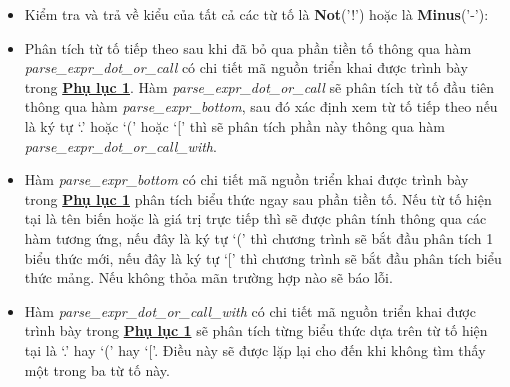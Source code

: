 \begin{itemize}
    \item Kiểm tra và trả về kiểu của tất cả các từ tố là \textbf{Not}('!') hoặc là \textbf{Minus}('-'):
    \item Phân tích từ tố tiếp theo sau khi đã bỏ qua phần tiền tố thông qua hàm \textit{parse\_expr\_dot\_or\_call} có chi tiết mã nguồn triển khai được trình bày trong \hyperref[ap1:expr]{\bf Phụ lục 1}. Hàm \textit{parse\_expr\_dot\_or\_call} sẽ phân tích từ tố đầu tiên thông qua hàm \textit{parse\_expr\_bottom}, sau đó xác định xem từ tố tiếp theo nếu là ký tự `.' hoặc `(' hoặc `[' thì sẽ phân tích phần này thông qua hàm \textit{parse\_expr\_dot\_or\_call\_with}. %
    \item Hàm \textit{parse\_expr\_bottom} có chi tiết mã nguồn triển khai được trình bày trong \hyperref[ap1:expr]{\bf Phụ lục 1} phân tích biểu thức ngay sau phần tiền tố. Nếu từ tố hiện tại là tên biến hoặc là giá trị trực tiếp thì sẽ được phân tính thông qua các hàm tương ứng, nếu đây là ký tự `(' thì chương trình sẽ bắt đầu phân tích 1 biểu thức mới, nếu đây là ký tự `[' thì chương trình sẽ bắt đầu phân tích biểu thức mảng. Nếu không thỏa mãn trường hợp nào sẽ báo lỗi. %
    \item Hàm \textit{parse\_expr\_dot\_or\_call\_with} có chi tiết mã nguồn triển khai được trình bày trong \hyperref[ap1:expr]{\bf Phụ lục 1} sẽ phân tích từng biểu thức dựa trên từ tố hiện tại là `.' hay `(' hay `['. Điều này sẽ được lặp lại cho đến khi không tìm thấy một trong ba từ tố này. %
\end{itemize}
